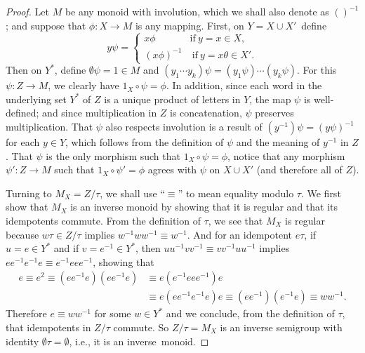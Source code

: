 \documentclass{surv-l}
\numberwithin{equation}{section}
\numberwithin{table}{section}
\numberwithin{figure}{section}
\theoremstyle{plain}
\theoremstyle{definition}
\begin{document}
\begin{proof} Let $M$ be any monoid with involution, which we shall also
denote as $()^{-1}$; and suppose that $\phi : X\rightarrow M$ is
any mapping. First, on $Y=X\cup X'$~define
\[
y\psi=\begin{cases}
x\phi &\mathrm{if}\ y=x\in X,\\
(x\phi)^{-1} &\ \mathrm{if}\ y=x\theta\in X'.
\end{cases}
\]
Then on $Y^{\ast}$, define $\emptyset\psi=1\in M$ and
$(y_{1}\cdots y_{k})\psi=(y_{1}\psi)\cdots(y_{k}\psi)$. For this
$\psi : Z\rightarrow M$, we clearly have $1_{X}\circ\psi=\phi$. In
addition, since each word in the underlying set $Y^{\ast}$ of $Z$
is a unique product of letters in $Y$, the map $\psi$ is
well-defined; and since multiplication in $Z$ is concatenation,
$\psi$ preserves multiplication. That $\psi$ also respects
involution is a result of $(y^{-1})\psi=(y\psi)^{-1}$ for each
$y\in Y$, which follows from the definition of $\psi$ and the
meaning of $y^{-1}$ in $Z$. That $\psi$ is the only morphism such
that $ 1_{X}\circ\psi=\phi$, notice that any morphism $\psi' :
Z\rightarrow M$ such that $ 1_{X}\circ\psi'=\phi$ agrees with
$\psi$ on $X\cup X'$ (and therefore all of $Z$).

Turning to $M_{X}=Z/\tau$, we shall use ``$\equiv$'' to mean
equality modulo $\tau$. We first show that $M_{X}$ is an inverse
monoid by showing that it is regular and that its idempotents
commute. From the definition of $\tau$, we see that $M_{X}$ is
regular because $w\tau\in Z/\tau$ implies $w^{-1}ww^{-1}\equiv
w^{-1}$. And for an idempotent $e\tau$, if $u=e\in Y^{\ast}$ and
if $v=e^{-1}\in Y^{\ast}$, then $uu^{-1}vv^{-1}\equiv
vv^{-1}uu^{-1}$ implies $ee^{-1}e^{-1}e\equiv e^{-1}eee^{-1}$,
showing that
\begin{align*}
e\equiv e^{2}\equiv(ee^{-1}e)(ee^{-1}e)&\equiv e(e^{-1}eee^{-1})e \\
&\equiv e(ee^{-1}e^{-1}e)e\equiv(ee^{-1})(e^{-1}e)\equiv ww^{-1}.
\end{align*}
Therefore $e\equiv ww^{-1}$ for some $w\in Y^{\ast}$ and we
conclude, from the definition of $\tau$, that idempotents in
$Z/\tau$ commute. So $Z/\tau=M_{X}$ is an inverse semigroup with
identity $\emptyset\tau=\emptyset$, i.e., it is an inverse~monoid.


\end{proof}
\end{document}
